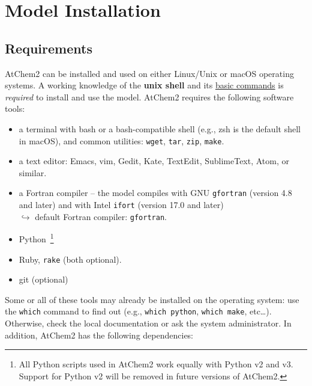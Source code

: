%
%
%
%

\chapter{Model Installation} \label{ch:installation}

\section{Requirements} \label{sec:requirements}

AtChem2 can be installed and used on either Linux/Unix or macOS
operating systems. A working knowledge of the \textbf{unix shell} and
its \href{https://swcarpentry.github.io/shell-novice}{basic commands}
is \emph{required} to install and use the model. AtChem2 requires the
following software tools:

\begin{itemize}
\item a terminal with bash or a bash-compatible shell (e.g., zsh is
  the default shell in macOS), and common utilities: \texttt{wget},
  \texttt{tar}, \texttt{zip}, \texttt{make}.
\item a text editor: Emacs, vim, Gedit, Kate, TextEdit, SublimeText,
  Atom, or similar.
\item a Fortran compiler -- the model compiles with GNU \texttt{gfortran}
  (version 4.8 and later) and with Intel \texttt{ifort} (version 17.0 and later)\\
  $\hookrightarrow$ default Fortran compiler: \texttt{gfortran}.
\item Python~\footnote{All Python scripts used in AtChem2 work equally
    with Python v2 and v3. Support for Python v2 will be removed in
    future versions of AtChem2.}
\item Ruby, \texttt{rake} (both optional).
\item git (optional)
\end{itemize}

Some or all of these tools may already be installed on the operating
system: use the \texttt{which} command to find out (e.g.,
\verb|which python|, \verb|which make|, etc\ldots). Otherwise, check
the local documentation or ask the system administrator. In addition,
AtChem2 has the following dependencies:

